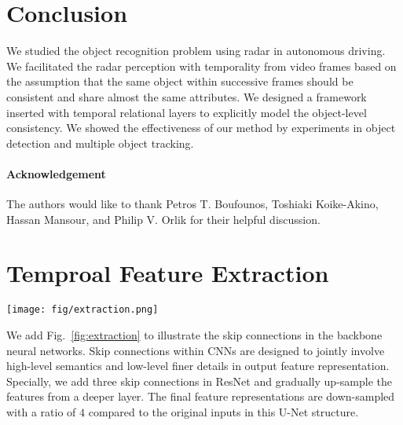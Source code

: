 \documentclass[10pt,twocolumn,letterpaper]{article}
\begin{document}
\section{Conclusion}

We studied the object recognition problem using radar in autonomous driving. We facilitated the radar perception with temporality from video frames based on the assumption that the same object within successive frames should be consistent and share almost the same attributes. We designed a framework inserted with temporal relational layers to explicitly model the object-level consistency. We showed the effectiveness of our method by experiments in object detection and multiple object tracking.

\vspace{-4mm}
\paragraph{Acknowledgement} The authors would like to thank Petros T. Boufounos, Toshiaki Koike-Akino, Hassan Mansour, and Philip V. Orlik for their helpful discussion.


\clearpage
{\small


}



\clearpage
\appendix

\section{Temproal Feature Extraction}

\begin{figure*}[ht]
    \centering
    \texttt{[image: fig/extraction.png]}
    \caption{The backbone networks are inserted with several skip connections to collect features at different scales for predictions. Features selected for temporal relations modeling are attached with positional encoding to reveal the locality of objects.}
    \label{fig:extraction}
\end{figure*}

We add Fig.~\ref{fig:extraction} to illustrate the skip connections in the backbone neural networks. Skip connections within CNNs are designed to jointly involve high-level semantics and low-level finer details in output feature representation. Specially, we add three skip connections in ResNet and gradually up-sample the features from a deeper layer. The final feature representations are down-sampled with a ratio of $4$ compared to the original inputs in this U-Net structure.
\end{document}
